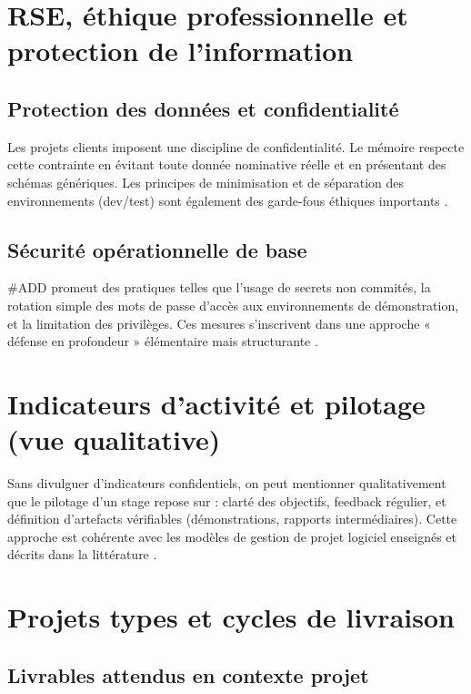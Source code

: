 \section{RSE, éthique professionnelle et protection de l'information}

\subsection{Protection des données et confidentialité}

Les projets clients imposent une discipline de confidentialité. Le mémoire respecte cette contrainte en évitant toute donnée nominative réelle et en présentant des schémas génériques. Les principes de minimisation et de séparation des environnements (dev/test) sont également des garde-fous éthiques importants \cite{iso25010,owasp2021}.

\subsection{Sécurité opérationnelle de base}

\#ADD promeut des pratiques telles que l'usage de secrets non commités, la rotation simple des mots de passe d'accès aux environnements de démonstration, et la limitation des privilèges. Ces mesures s'inscrivent dans une approche « défense en profondeur » élémentaire mais structurante \cite{owasp2021}.

\section{Indicateurs d'activité et pilotage (vue qualitative)}

Sans divulguer d'indicateurs confidentiels, on peut mentionner qualitativement que le pilotage d'un stage repose sur : clarté des objectifs, feedback régulier, et définition d'artefacts vérifiables (démonstrations, rapports intermédiaires). Cette approche est cohérente avec les modèles de gestion de projet logiciel enseignés et décrits dans la littérature \cite{pressman2014,sommerville2016}.

\section{Projets types et cycles de livraison}

\subsection{Livrables attendus en contexte projet}

